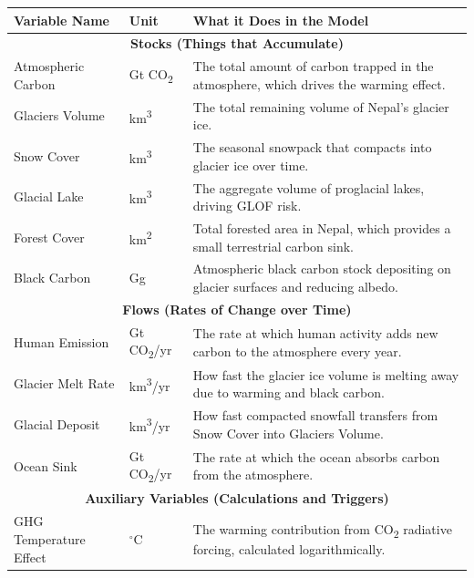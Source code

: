 \documentclass[12pt, a4paper]{article}
\begin{document}
\begin{table}[H]
    \centering
    \renewcommand{\arraystretch}{1.3}
    \begin{tabular}{|p{3.5cm}|p{2cm}|p{9cm}|}
        \hline
        \textbf{Variable Name} & \textbf{Unit} & \textbf{What it Does in the Model} \\
        \hline
        \multicolumn{3}{|c|}{\textbf{Stocks (Things that Accumulate)}} \\
        \hline
        Atmospheric Carbon & Gt CO\textsubscript{2} & The total amount of carbon trapped in the atmosphere, which drives the warming effect. \\
        Glaciers Volume & km\textsuperscript{3} & The total remaining volume of Nepal's glacier ice. \\
        Snow Cover & km\textsuperscript{3} & The seasonal snowpack that compacts into glacier ice over time. \\
        Glacial Lake & km\textsuperscript{3} & The aggregate volume of proglacial lakes, driving GLOF risk. \\
        Forest Cover & km\textsuperscript{2} & Total forested area in Nepal, which provides a small terrestrial carbon sink. \\
        Black Carbon & Gg & Atmospheric black carbon stock depositing on glacier surfaces and reducing albedo. \\
        \hline
        \multicolumn{3}{|c|}{\textbf{Flows (Rates of Change over Time)}} \\
        \hline
        Human Emission & Gt CO\textsubscript{2}/yr & The rate at which human activity adds new carbon to the atmosphere every year. \\
        Glacier Melt Rate & km\textsuperscript{3}/yr & How fast the glacier ice volume is melting away due to warming and black carbon. \\
        Glacial Deposit & km\textsuperscript{3}/yr & How fast compacted snowfall transfers from Snow Cover into Glaciers Volume. \\
        Ocean Sink & Gt CO\textsubscript{2}/yr & The rate at which the ocean absorbs carbon from the atmosphere. \\
        \hline
        \multicolumn{3}{|c|}{\textbf{Auxiliary Variables (Calculations and Triggers)}} \\
        \hline
        GHG Temperature Effect & $^\circ$C & The warming contribution from CO\textsubscript{2} radiative forcing, calculated logarithmically. \\

\end{tabular}
\end{table}
\end{document}
